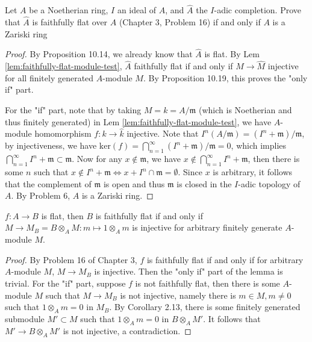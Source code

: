 \documentclass{solution}
\begin{document}
\begin{problem}
    Let $A$ be a Noetherian ring, $I$ an ideal of $A$, and $\hat{A}$ the $I$-adic completion. Prove that $\hat{A}$ is faithfully flat over $A$ (Chapter 3, Problem 16) if and only if $A$ is a Zariski ring
\end{problem}

\begin{proof}
    By Proposition 10.14, we already know that $\hat{A}$ is flat. By Lem \ref{lem:faithfully-flat-module-test}, $\hat{A}$ faithfully flat if and only if $M \rightarrow \hat{M}$ injective for all finitely generated $A$-module $M$. By Proposition 10.19, this proves the "only if" part.

    For the "if" part, note that by taking $M = k = A / \mathfrak{m}$ (which is Noetherian and thus finitely generated) in Lem \ref{lem:faithfully-flat-module-test}, we have $A$-module homomorphism $f: k \rightarrow \hat{k}$ injective. Note that $I^n (A / \mathfrak{m}) = (I^n + \mathfrak{m}) / \mathfrak{m}$, by injectiveness, we have $\mathrm{ker}(f) = \bigcap\limits_{n = 1}^{\infty} (I^n + \mathfrak{m}) / \mathfrak{m} = 0$, which implies $\bigcap\limits_{n = 1}^{\infty} I^n + \mathfrak{m} \subset \mathfrak{m}$. Now for any $x \notin \mathfrak{m}$, we have $x \notin \bigcap\limits_{n = 1}^{\infty} I^n + \mathfrak{m}$, then there is some $n$ such that $x \notin I^n + \mathfrak{m} \Leftrightarrow x + I^n \cap \mathfrak{m} = \emptyset$. Since $x$ is arbitrary, it follows that the complement of $\mathfrak{m}$ is open and thus $\mathfrak{m}$ is closed in the $I$-adic topology of $A$. By Problem 6, $A$ is a Zariski ring.
\end{proof}

\begin{lemma}\label{lem:faithfully-flat-module-test}
    $f: A \rightarrow B$ is flat, then $B$ is faithfully flat if and only if $M \rightarrow M_B = B \otimes_A M: m \mapsto 1 \otimes_A m$ is injective for arbitrary finitely generate $A$-module $M$.
\end{lemma}

\begin{proof}
    By Problem 16 of Chapter 3, $f$ is faithfully flat if and only if for arbitrary $A$-module $M$, $M \rightarrow M_B$ is injective. Then the "only if" part of the lemma is trivial. For the "if" part, suppose $f$ is not faithfully flat, then there is some $A$-module $M$ such that $M \rightarrow M_B$ is not injective, namely there is $m \in M, m \ne 0$ such that $1 \otimes_A m = 0$ in $M_B$. By Corollary 2.13, there is some finitely generated submodule $M' \subset M$ such that $1 \otimes_A m = 0$ in $B \otimes_A M'$. It follows that $M' \rightarrow B \otimes_A M'$ is not injective, a contradiction.
\end{proof}
\end{document}
